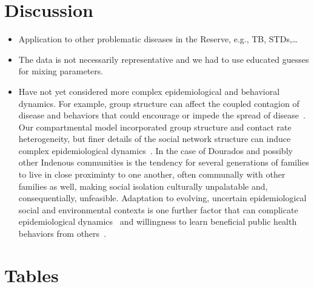 \documentclass[
  letterpaper,
  abstract]{scrartcl}
\begin{document}
\section{Discussion}\label{discussion}


\begin{itemize}
  \item 
    Application to other problematic diseases in the Reserve, e.g., TB, STDs,\ldots 
  \item
    The data is not necessarily representative and we had to use educated guesses
    for mixing parameters.
  \item
    Have not yet considered more complex epidemiological and behavioral
    dynamics. For example, group structure can affect the coupled contagion of
    disease and behaviors that could encourage or impede the spread of
    disease~\autocite{SmaldinoJones2021}. Our compartmental model
    incorporated group structure and contact rate heterogeneity, but finer
    details of the social network structure can induce complex
    epidemiological dynamics~\autocite{Arthur2017}. In the case of Dourados
    and possibly other Indenous communities is the tendency for several
    generations of families to live in close proximinty to one another,
    often communally with other families as well, making social isolation
    culturally unpalatable and, consequentially, unfeasible. Adaptation to
    evolving, uncertain epidemiological social and environmental contexts is
    one further factor that can complicate epidemiological
    dynamics~\autocite{Arthur2021} and willingness to learn beneficial public
    health behaviors from others~\autocite{Turner2023a}.
\end{itemize}


\printbibliography[title=References]


\clearpage

\section{Tables}
\end{document}
